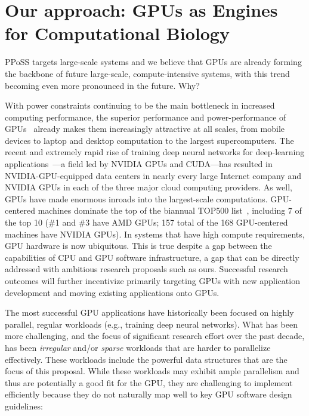 
\section{Our approach: GPUs as Engines for Computational Biology}
\label{sec:gpu}

PPoSS targets large-scale systems and we believe that GPUs are already forming the backbone of future large-scale, compute-intensive systems, with this trend becoming even more pronounced in the future. Why?

With power constraints continuing to be the main bottleneck in increased computing performance, the superior performance and power-performance of GPUs~\cite{Dally:2010:GCT,Dally:2021:EOT} already makes them increasingly attractive at all scales, from mobile devices to laptop and desktop computation to the largest supercomputers. The recent and extremely rapid rise of training deep neural networks for deep-learning applications~\cite{Amodei:2015:DS2,Chetlur:2014:CEP,Coates:2013:DLW,Hannun:2014:DSU}---a field led by NVIDIA GPUs and CUDA---has resulted in NVIDIA-GPU-equipped data centers in nearly every large Internet company and NVIDIA GPUs in each of the three major cloud computing providers. As well, GPUs have made enormous inroads into the largest-scale computations. GPU-centered machines dominate the top of the biannual TOP500 list~\cite{top500:nov2022}, including 7 of the top 10 (\#1 and \#3 have AMD GPUs; 157 total of the 168 GPU-centered machines have NVIDIA GPUs). In systems that have high compute requirements, GPU hardware is now ubiquitous. This is true despite a gap between the capabilities of CPU and GPU software infrastructure, a gap that can be directly addressed with ambitious research proposals such as ours. Successful research outcomes will further incentivize primarily targeting GPUs with new application development and moving existing applications onto GPUs.

The most successful GPU applications have historically been focused on highly parallel, regular workloads (e.g., training deep neural networks). What has been more challenging, and the focus of significant research effort over the past decade, has been \emph{irregular} and/or \emph{sparse} workloads that are harder to parallelize effectively. These workloads include the powerful data structures that are the focus of this proposal. While these workloads may exhibit ample parallelism and thus are potentially a good fit for the GPU, they are challenging to implement efficiently because they do not naturally map well to key GPU software design guidelines:

